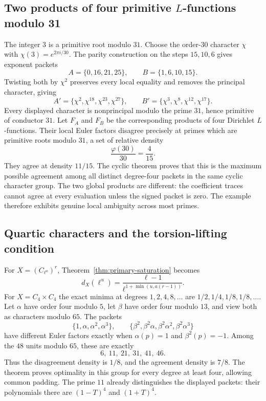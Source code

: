 \documentclass[11pt]{article}
\theoremstyle{definition}
\theoremstyle{remark}
\begin{document}
\subsection{Two products of four primitive $L$-functions modulo 31}
The integer $3$ is a primitive root modulo $31$. Choose the order-$30$ character $\chi$ with $\chi(3)=e^{2\pi i/30}$. The parity construction on the steps $15,10,6$ gives exponent packets
\[
 A=\{0,16,21,25\},\qquad B=\{1,6,10,15\}.
\]
Twisting both by $\chi^2$ preserves every local equality and removes the principal character, giving
\[
 A'=\{\chi^2,\chi^{18},\chi^{23},\chi^{27}\},\qquad
 B'=\{\chi^3,\chi^8,\chi^{12},\chi^{17}\}.
\]
Every displayed character is nonprincipal modulo the prime $31$, hence primitive of conductor $31$. Let $F_A$ and $F_B$ be the corresponding products of four Dirichlet $L$-functions. Their local Euler factors disagree precisely at primes which are primitive roots modulo $31$, a set of relative density
\[
 \frac{\varphi(30)}{30}=\frac4{15}.
\]
They agree at density $11/15$. The cyclic theorem proves that this is the maximum possible agreement among all distinct degree-four packets in the same cyclic character group. The two global products are different: the coefficient traces cannot agree at every evaluation unless the signed packet is zero. The example therefore exhibits genuine local ambiguity across most primes.

\subsection{Quartic characters and the torsion-lifting condition}
For $X=(C_{\ell^a})^r$, Theorem~\ref{thm:primary-saturation} becomes
\[
 d_X(\ell^u)=\frac{\ell-1}{\ell^{1+\min(u,a(r-1))}}.
\]
For $X=C_4\times C_4$ the exact minima at degrees $1,2,4,8,\ldots$ are $1/2,1/4,1/8,1/8,\ldots$. Let $\alpha$ have order four modulo $5$, let $\beta$ have order four modulo $13$, and view both as characters modulo $65$. The packets
\[
 \{1,\alpha,\alpha^2,\alpha^3\},\qquad
 \{\beta^2,\beta^2\alpha,\beta^2\alpha^2,\beta^2\alpha^3\}
\]
have different Euler factors exactly when $\alpha(p)=1$ and $\beta^2(p)=-1$. Among the $48$ units modulo $65$, these are exactly
\[
 6,\ 11,\ 21,\ 31,\ 41,\ 46.
\]
Thus the disagreement density is $1/8$, and the agreement density is $7/8$. The theorem proves optimality in this group for every degree at least four, allowing common padding. The prime $11$ already distinguishes the displayed packets: their polynomials there are $(1-T)^4$ and $(1+T)^4$.
\end{document}
